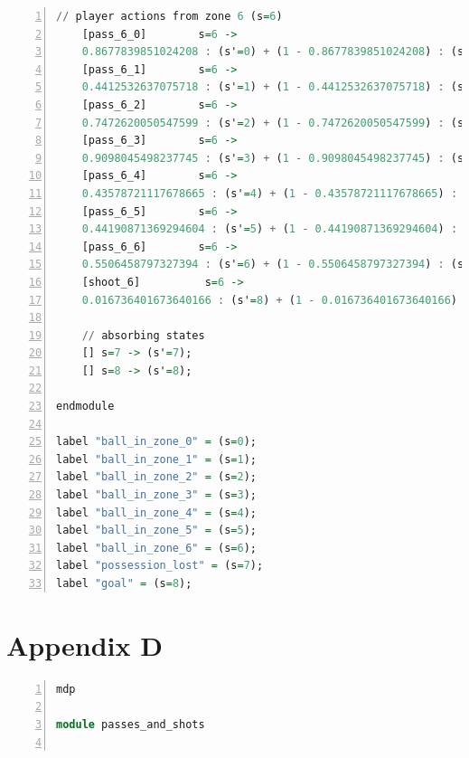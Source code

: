 \documentclass{l4proj}
\begin{document}
\begin{appendices}
\begin{lstlisting}[language=Haskell, numbers=left, caption=Initial MDP specification in the PRISM modelling language.]
	// player actions from zone 6 (s=6)
	[pass_6_0]	      s=6 ->
	0.8677839851024208 : (s'=0) + (1 - 0.8677839851024208) : (s'=7);
	[pass_6_1]	      s=6 ->
	0.4412532637075718 : (s'=1) + (1 - 0.4412532637075718) : (s'=7);
	[pass_6_2]	      s=6 ->
	0.7472620050547599 : (s'=2) + (1 - 0.7472620050547599) : (s'=7);
	[pass_6_3]	      s=6 ->
	0.9098045498237745 : (s'=3) + (1 - 0.9098045498237745) : (s'=7);
	[pass_6_4]	      s=6 ->
	0.43578721117678665 : (s'=4) + (1 - 0.43578721117678665) : (s'=7);
	[pass_6_5]	      s=6 ->
	0.44190871369294604 : (s'=5) + (1 - 0.44190871369294604) : (s'=7);
	[pass_6_6]	      s=6 ->
	0.5506458797327394 : (s'=6) + (1 - 0.5506458797327394) : (s'=7);
	[shoot_6]	       s=6 ->
	0.016736401673640166 : (s'=8) + (1 - 0.016736401673640166) : (s'=7);

	// absorbing states
	[] s=7 -> (s'=7);
	[] s=8 -> (s'=8);

endmodule

label "ball_in_zone_0" = (s=0);
label "ball_in_zone_1" = (s=1);
label "ball_in_zone_2" = (s=2);
label "ball_in_zone_3" = (s=3);
label "ball_in_zone_4" = (s=4);
label "ball_in_zone_5" = (s=5);
label "ball_in_zone_6" = (s=6);
label "possession_lost" = (s=7);
label "goal" = (s=8);

\end{lstlisting}

\chapter{Appendix D}\label{appendix4}

\begin{lstlisting}[language=Haskell, numbers=left, caption=MDP used for strategy generation. This is the model specification as-is after the refinements at the end of chapter 3.] 
mdp

module passes_and_shots


\end{lstlisting}
\end{appendices}
\end{document}
